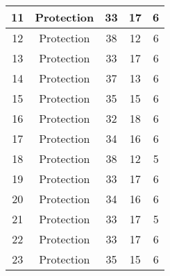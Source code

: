 \documentclass[results.tex]{subfiles}
\begin{document}
\begin{center}
\begin{tabular}{| c || c | c | c | c |}
            \hline
            11                      & Protection                   & 33                     & 17                      & 6                    \\
            \hline
            12                      & Protection                   & 38                     & 12                      & 6                    \\
            \hline
            13                      & Protection                   & 33                     & 17                      & 6                    \\
            \hline
            14                      & Protection                   & 37                     & 13                      & 6                    \\
            \hline
            15                      & Protection                   & 35                     & 15                      & 6                    \\
            \hline
            16                      & Protection                   & 32                     & 18                      & 6                    \\
            \hline
            17                      & Protection                   & 34                     & 16                      & 6                    \\
            \hline
            18                      & Protection                   & 38                     & 12                      & 5                    \\
            \hline
            19                      & Protection                   & 33                     & 17                      & 6                    \\
            \hline
            20                      & Protection                   & 34                     & 16                      & 6                    \\
            \hline
            21                      & Protection                   & 33                     & 17                      & 5                    \\
            \hline
            22                      & Protection                   & 33                     & 17                      & 6                    \\
            \hline
            23                      & Protection                   & 35                     & 15                      & 6                    \\

\end{tabular}
\end{center}
\end{document}
